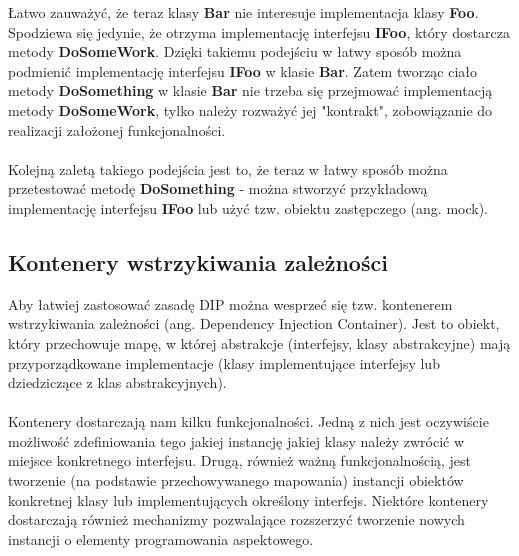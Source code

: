 \documentclass[12pt]{article}
\begin{document}
Łatwo zauważyć, że teraz klasy \textbf{Bar} nie interesuje implementacja klasy \textbf{Foo}. Spodziewa się jedynie, że otrzyma implementację interfejsu \textbf{IFoo}, który dostarcza metody \textbf{DoSomeWork}. Dzięki takiemu podejściu w łatwy sposób można podmienić implementację interfejsu \textbf{IFoo} w klasie \textbf{Bar}. Zatem tworząc ciało metody \textbf{DoSomething} w klasie \textbf{Bar} nie trzeba się przejmować implementacją metody \textbf{DoSomeWork}, tylko należy rozważyć jej "kontrakt", zobowiązanie do realizacji założonej funkcjonalności.\\
\\
Kolejną zaletą takiego podejścia jest to, że teraz w łatwy sposób można przetestować metodę \textbf{DoSomething} - można stworzyć przykładową implementację interfejsu \textbf{IFoo} lub użyć tzw. obiektu zastępczego (ang. mock).


\subsection{Kontenery wstrzykiwania zależności}
Aby łatwiej zastosować zasadę DIP można wesprzeć się tzw. kontenerem wstrzykiwania zależności (ang. Dependency Injection Container). Jest to obiekt, który przechowuje mapę, w której abstrakcje (interfejsy, klasy abstrakcyjne) mają przyporządkowane implementacje (klasy implementujące interfejsy lub dziedziczące z klas abstrakcyjnych).\\
\\
Kontenery dostarczają nam kilku funkcjonalności. Jedną z nich jest oczywiście możliwość zdefiniowania tego jakiej instancję jakiej klasy należy zwrócić w miejsce konkretnego interfejsu. Drugą, również ważną funkcjonalnością, jest tworzenie (na podstawie przechowywanego mapowania) instancji obiektów konkretnej klasy lub implementujących określony interfejs. Niektóre kontenery dostarczają również mechanizmy pozwalające rozszerzyć tworzenie nowych instancji o elementy programowania aspektowego.
\end{document}
